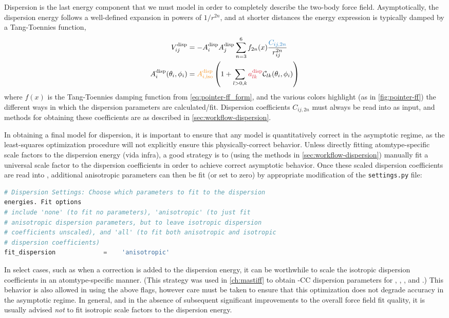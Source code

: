 Dispersion is the last energy component that we must model in order to
completely describe the two-body force field. Asymptotically, the dispersion energy follows a
well-defined expansion in powers of $1/r^{2n}$, and at shorter distances the
energy expression is typically damped by a Tang-Toennies
function,\cite{Tang1984,Tang1992} 
%
\begin{align}
\vdisp_{ij} &= -{\Adisp{i}\Adisp{j}} \sum\limits_{n=3}^{6} f_{2n}(x)
\frac{\textcolor{mon}{C_{ij,2n}}}{r_{ij}^{2n}} \\
\Adisp{i}(\theta_i,\phi_i) &=
\textcolor{cfit}{\Adisp{i,\text{iso}}}
\left(1 +
\sum\limits_{l>0,k} \textcolor{fit}{\adisp}  \mathcal{C}_{lk}(\theta_i,\phi_i)
\right)
\end{align}
%
where $f(x)$ is the Tang-Toennies damping function from
\cref{eq:pointer-ff_form}, and the various colors highlight (as in
\cref{fig:pointer-ff}) the different ways in which the dispersion parameters
are calculated/fit.
Dispersion coefficients 
${C_{ij,2n}}$
must always be read into
\pointer as input, and methods for obtaining these coefficients are as
described in  \cref{sec:workflow-dispersion}. 

In obtaining a final model for dispersion, it is important to ensure that any
model is quantitatively correct in the asymptotic regime, as the
least-squares optimization procedure \pointer will not explicitly ensure this
physically-correct behavior. Unless directly fitting atomtype-specific scale
factors to the dispersion energy (vida infra), a good strategy is to (using
the methods in \cref{sec:workflow-dispersion}) manually fit a universal scale factor to
the dispersion coefficients in order to achieve correct asymptotic behavior.
Once these scaled dispersion coefficients are read into \pointer, additional
anisotropic parameters can then be fit (or set to zero) by appropriate
modification of the \verb|settings.py| file:
\begin{lstlisting}[language=python]
# Dispersion Settings: Choose which parameters to fit to the dispersion
energies. Fit options
# include 'none' (to fit no parameters), 'anisotropic' (to just fit
# anisotropic dispersion parameters, but to leave isotropic dispersion
# coefficients unscaled), and 'all' (to fit both anisotropic and isotropic
# dispersion coefficients)
fit_dispersion             =    'anisotropic'
\end{lstlisting}

In select cases, such as when a \dccsdt correction is added to the
dispersion energy, it can be worthwhile to scale the isotropic
dispersion coefficients in an atomtype-specific manner. (This strategy was
used in \cref{ch:mastiff} to obtain \mastiff-CC dispersion parameters for \co, \nh, \ho,
and \cl.) This behavior is also allowed in \pointer using the above flags,
however care must be taken to ensure that this optimization does not degrade
accuracy in the asymptotic regime. In general, 
and in the absence
of subsequent significant improvements to the overall force field fit quality,
it is usually advised
\emph{not} to fit isotropic scale factors to the dispersion energy. 

